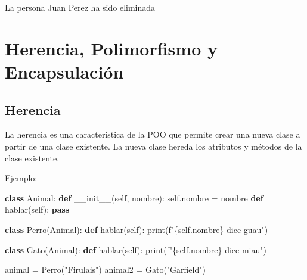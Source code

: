 \documentclass[
  a4paper,
  DIV=11,
  numbers=noendperiod,
  onepage,
  openany]{scrreprt}
\newenvironment{Shaded}{\begin{snugshade}}{\end{snugshade}}
\newcommand{\BuiltInTok}[1]{\textcolor[rgb]{0.00,0.23,0.31}{#1}}
\newcommand{\ControlFlowTok}[1]{\textcolor[rgb]{0.00,0.23,0.31}{\textbf{#1}}}
\newcommand{\FunctionTok}[1]{\textcolor[rgb]{0.28,0.35,0.67}{#1}}
\newcommand{\KeywordTok}[1]{\textcolor[rgb]{0.00,0.23,0.31}{\textbf{#1}}}
\newcommand{\NormalTok}[1]{\textcolor[rgb]{0.00,0.23,0.31}{#1}}
\newcommand{\OperatorTok}[1]{\textcolor[rgb]{0.37,0.37,0.37}{#1}}
\newcommand{\SpecialCharTok}[1]{\textcolor[rgb]{0.37,0.37,0.37}{#1}}
\newcommand{\SpecialStringTok}[1]{\textcolor[rgb]{0.13,0.47,0.30}{#1}}
\newcommand{\StringTok}[1]{\textcolor[rgb]{0.13,0.47,0.30}{#1}}
\newcommand{\VariableTok}[1]{\textcolor[rgb]{0.07,0.07,0.07}{#1}}
\begin{document}
\begin{Shaded}
\begin{Highlighting}[]
\NormalTok{La persona Juan Perez ha sido eliminada}
\end{Highlighting}
\end{Shaded}

\section{Herencia, Polimorfismo y
Encapsulación}\label{herencia-polimorfismo-y-encapsulaciuxf3n}

\subsection{Herencia}\label{herencia}

La herencia es una característica de la POO que permite crear una nueva
clase a partir de una clase existente. La nueva clase hereda los
atributos y métodos de la clase existente.

Ejemplo:

\begin{Shaded}
\begin{Highlighting}[]
\KeywordTok{class}\NormalTok{ Animal:}
    \KeywordTok{def} \FunctionTok{\_\_init\_\_}\NormalTok{(}\VariableTok{self}\NormalTok{, nombre):}
        \VariableTok{self}\NormalTok{.nombre }\OperatorTok{=}\NormalTok{ nombre}
    \KeywordTok{def}\NormalTok{ hablar(}\VariableTok{self}\NormalTok{):}
        \ControlFlowTok{pass}

\KeywordTok{class}\NormalTok{ Perro(Animal):}
    \KeywordTok{def}\NormalTok{ hablar(}\VariableTok{self}\NormalTok{):}
        \BuiltInTok{print}\NormalTok{(}\SpecialStringTok{f"}\SpecialCharTok{\{}\VariableTok{self}\SpecialCharTok{.}\NormalTok{nombre}\SpecialCharTok{\}}\SpecialStringTok{ dice guau"}\NormalTok{)}

\KeywordTok{class}\NormalTok{ Gato(Animal):}
    \KeywordTok{def}\NormalTok{ hablar(}\VariableTok{self}\NormalTok{):}
      \BuiltInTok{print}\NormalTok{(}\SpecialStringTok{f"}\SpecialCharTok{\{}\VariableTok{self}\SpecialCharTok{.}\NormalTok{nombre}\SpecialCharTok{\}}\SpecialStringTok{ dice miau"}\NormalTok{)}


\NormalTok{animal }\OperatorTok{=}\NormalTok{ Perro(}\StringTok{"Firulais"}\NormalTok{)}
\NormalTok{animal2 }\OperatorTok{=}\NormalTok{ Gato(}\StringTok{"Garfield"}\NormalTok{)}
\end{Highlighting}
\end{Shaded}
\end{document}
